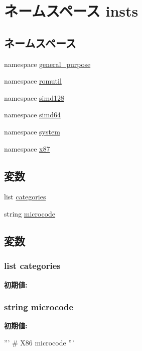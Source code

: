 \hypertarget{namespaceinsts}{
\section{ネームスペース insts}
\label{namespaceinsts}
}
\subsection*{ネームスペース}
\begin{DoxyCompactItemize}
\item 
namespace \hyperlink{namespaceinsts_1_1general__purpose}{general\_\-purpose}
\item 
namespace \hyperlink{namespaceinsts_1_1romutil}{romutil}
\item 
namespace \hyperlink{namespaceinsts_1_1simd128}{simd128}
\item 
namespace \hyperlink{namespaceinsts_1_1simd64}{simd64}
\item 
namespace \hyperlink{namespaceinsts_1_1system}{system}
\item 
namespace \hyperlink{namespaceinsts_1_1x87}{x87}
\end{DoxyCompactItemize}
\subsection*{変数}
\begin{DoxyCompactItemize}
\item 
list \hyperlink{namespaceinsts_a273cf0f1630af14c1582f05e53354a55}{categories}
\item 
string \hyperlink{namespaceinsts_a770f11a173e99389a8802f0107ed8f52}{microcode}
\end{DoxyCompactItemize}


\subsection{変数}
\hypertarget{namespaceinsts_a273cf0f1630af14c1582f05e53354a55}{
\subsubsection[{categories}]{\setlength{\rightskip}{0pt plus 5cm}list {\bf categories}}}
\label{namespaceinsts_a273cf0f1630af14c1582f05e53354a55}
{\bfseries 初期値:}
\begin{DoxyCode}
\end{DoxyCode}
\hypertarget{namespaceinsts_a770f11a173e99389a8802f0107ed8f52}{
\subsubsection[{microcode}]{\setlength{\rightskip}{0pt plus 5cm}string {\bf microcode}}}
\label{namespaceinsts_a770f11a173e99389a8802f0107ed8f52}
{\bfseries 初期値:}
\begin{DoxyCode}
'''
# X86 microcode
'''
\end{DoxyCode}
